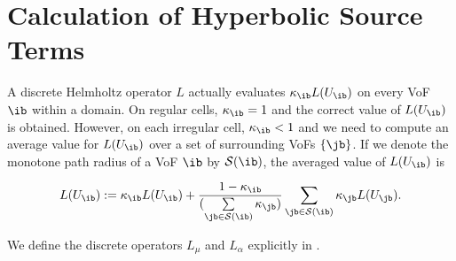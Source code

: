 \section{Calculation of Hyperbolic Source Terms\label{sec:HyperbolicSources}}

A discrete Helmholtz operator $L$ actually evaluates $\kappa_\ib L(U_\ib)$ on 
every VoF $\ib$ within a domain. On regular cells, $\kappa_\ib = 1$ and 
the correct value of $L(U_\ib)$ is obtained. However, on each irregular 
cell, $\kappa_\ib < 1$ and we need to compute an average value for $L(U_\ib)$ 
over a set of surrounding VoFs $\{\jb\}$. If we denote the monotone path radius 
of a VoF $\ib$ by $\mathcal{S}(\ib)$, the averaged value of 
$L(U_\ib)$ is 

\begin{equation}
L(U_\ib) := \kappa_\ib L(U_\ib) + \frac{1-\kappa_\ib}
{(\sum\limits_{\jb \in \mathcal{S}(\ib)} \kappa_\jb)} 
\sum\limits_{\jb \in \mathcal{S}(\ib)} \kappa_\jb L(U_\jb).
\end{equation}

We define the discrete operators $L_\mu$ and $L_\alpha$ explicitly in 
.

